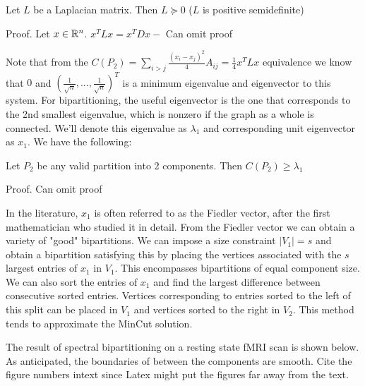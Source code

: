 \begin{theorem} \label{Laplacian_psd}
Let $L$ be a Laplacian matrix. Then $L \succeq 0$
($L$ is positive semidefinite)

Proof. Let $x \in \mathbb{R}^n$. $x^T L x = x^T D x - $ {\color{red}Can omit proof}
\end{theorem}

Note that from the
$C(P_2) = \sum_{i > j} \frac{(x_i - x_j)^2}{4} A_{ij}
        = \frac{1}{4} x^T L x$ equivalence we know that
$0$ and $(\frac{1}{\sqrt{n}}, ..., \frac{1}{\sqrt{n}})^T$ is a minimum
eigenvalue and eigenvector to this system. For bipartitioning, the
useful eigenvector is the one that corresponds to the 2nd smallest
eigenvalue, which is nonzero if the graph as a whole is connected.
We'll denote this eigenvalue as $\lambda_1$ and corresponding unit
eigenvector as $x_1$. We have the following:

\begin{theorem}
Let $P_2$ be any valid partition into 2 components. Then
$C(P_2) \geq \lambda_1$

Proof. {\color{red}Can omit proof}
\end{theorem}

In the literature, $x_1$ is often referred to as the Fiedler vector,
after the first mathematician who studied it in detail.
From the Fiedler vector we can obtain a variety of "good" bipartitions.
We can impose a size constraint $|V_1| = s$ and obtain a bipartition
satisfying this by placing the vertices associated with the $s$ largest
entries of $x_1$ in $V_1$. This encompasses bipartitions of equal
component size. We can also sort the entries of $x_1$ and find the
largest difference between consecutive sorted entries. Vertices
corresponding to entries sorted to the left of this split can be placed
in $V_1$ and vertices sorted to the right in $V_2$. This method tends to
approximate the MinCut solution.

The result of spectral bipartitioning on a resting state fMRI scan
is shown below. As anticipated, the boundaries of between the
components are smooth. {\color{red}Cite the figure numbers intext
since Latex might put the figures far away from the text.}

